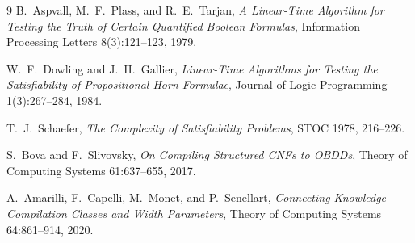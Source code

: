 \begin{thebibliography}{9}
B.~Aspvall, M.~F.~Plass, and R.~E.~Tarjan,
\emph{A Linear-Time Algorithm for Testing the Truth of Certain Quantified Boolean Formulas},
Information Processing Letters 8(3):121--123, 1979.

W.~F.~Dowling and J.~H.~Gallier,
\emph{Linear-Time Algorithms for Testing the Satisfiability of Propositional Horn Formulae},
Journal of Logic Programming 1(3):267--284, 1984.

T.~J.~Schaefer,
\emph{The Complexity of Satisfiability Problems},
STOC 1978, 216--226.

S.~Bova and F.~Slivovsky,
\emph{On Compiling Structured CNFs to OBDDs},
Theory of Computing Systems 61:637--655, 2017.

A.~Amarilli, F.~Capelli, M.~Monet, and P.~Senellart,
\emph{Connecting Knowledge Compilation Classes and Width Parameters},
Theory of Computing Systems 64:861--914, 2020.
\end{thebibliography}


